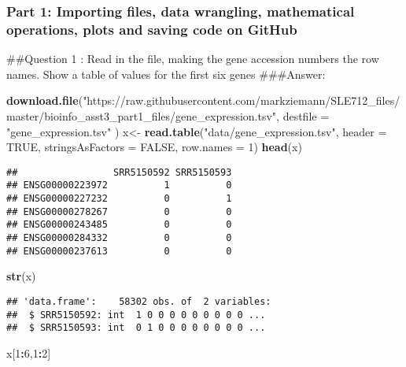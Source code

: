 \documentclass[]{article}
\author{Nishat Nini Urmi}
\date{12/6/2020}
\newenvironment{Shaded}{\begin{snugshade}}{\end{snugshade}}
\newcommand{\DataTypeTok}[1]{\textcolor[rgb]{0.13,0.29,0.53}{#1}}
\newcommand{\DecValTok}[1]{\textcolor[rgb]{0.00,0.00,0.81}{#1}}
\newcommand{\KeywordTok}[1]{\textcolor[rgb]{0.13,0.29,0.53}{\textbf{#1}}}
\newcommand{\NormalTok}[1]{#1}
\newcommand{\OperatorTok}[1]{\textcolor[rgb]{0.81,0.36,0.00}{\textbf{#1}}}
\newcommand{\OtherTok}[1]{\textcolor[rgb]{0.56,0.35,0.01}{#1}}
\newcommand{\StringTok}[1]{\textcolor[rgb]{0.31,0.60,0.02}{#1}}
\begin{document}
\hypertarget{part-1-importing-files-data-wrangling-mathematical-operations-plots-and-saving-code-on-github}{%
\subsubsection{Part 1: Importing files, data wrangling, mathematical
operations, plots and saving code on
GitHub}\label{part-1-importing-files-data-wrangling-mathematical-operations-plots-and-saving-code-on-github}}

\#\#Question 1 : Read in the file, making the gene accession numbers the
row names. Show a table of values for the first six genes \#\#\#Answer:

\begin{Shaded}
\begin{Highlighting}[]
\KeywordTok{download.file}\NormalTok{(}\StringTok{"https://raw.githubusercontent.com/markziemann/SLE712_files/master/bioinfo_asst3_part1_files/gene_expression.tsv"}\NormalTok{, }\DataTypeTok{destfile =} \StringTok{"gene_expression.tsv"}\NormalTok{ )}
\NormalTok{x<-}\StringTok{ }\KeywordTok{read.table}\NormalTok{(}\StringTok{"data/gene_expression.tsv"}\NormalTok{, }\DataTypeTok{header =} \OtherTok{TRUE}\NormalTok{, }\DataTypeTok{stringsAsFactors =} \OtherTok{FALSE}\NormalTok{, }\DataTypeTok{row.names =} \DecValTok{1}\NormalTok{)}
\KeywordTok{head}\NormalTok{(x)}
\end{Highlighting}
\end{Shaded}

\begin{verbatim}
##                 SRR5150592 SRR5150593
## ENSG00000223972          1          0
## ENSG00000227232          0          1
## ENSG00000278267          0          0
## ENSG00000243485          0          0
## ENSG00000284332          0          0
## ENSG00000237613          0          0
\end{verbatim}

\begin{Shaded}
\begin{Highlighting}[]
\KeywordTok{str}\NormalTok{(x)}
\end{Highlighting}
\end{Shaded}

\begin{verbatim}
## 'data.frame':    58302 obs. of  2 variables:
##  $ SRR5150592: int  1 0 0 0 0 0 0 0 0 0 ...
##  $ SRR5150593: int  0 1 0 0 0 0 0 0 0 0 ...
\end{verbatim}

\begin{Shaded}
\begin{Highlighting}[]
\NormalTok{x[}\DecValTok{1}\OperatorTok{:}\DecValTok{6}\NormalTok{,}\DecValTok{1}\OperatorTok{:}\DecValTok{2}\NormalTok{]}
\end{Highlighting}
\end{Shaded}
\end{document}

